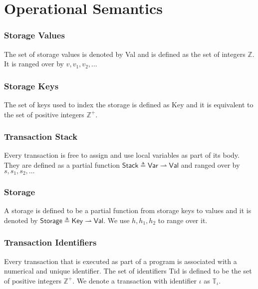 \section{Operational Semantics}

\subsubsection{Storage Values}

The set of storage values is denoted by \textsf{Val} and is defined as the set of integers $\mathds{Z}$. It is ranged over by $v, v_1, v_2, \ldots$

\subsubsection{Storage Keys}

The set of keys used to index the storage is defined as \textsf{Key} and it is equivalent to the set of positive integers $\mathds{Z}^+$.

\subsubsection{Transaction Stack}

Every transaction is free to assign and use local variables as part of its body. They are defined as a partial function $\mathsf{Stack} \triangleq \mathsf{Var} \rightharpoonup \mathsf{Val}$ and ranged over by $s, s_1, s_2, \ldots$

\subsubsection{Storage}

A storage is defined to be a partial function from storage keys to values and it is denoted by $\mathsf{Storage} \triangleq \mathsf{Key} \rightharpoonup \mathsf{Val}$. We use $h, h_1, h_2$ to range over it.

\subsubsection{Transaction Identifiers}

Every transaction that is executed as part of a program is associated with a numerical and unique identifier. The set of identifiers \textsf{Tid} is defined to be the set of positive integers $\mathds{Z}^+$. We denote a transaction with identifier $\iota$ as $\mathds{T}_\iota$.

